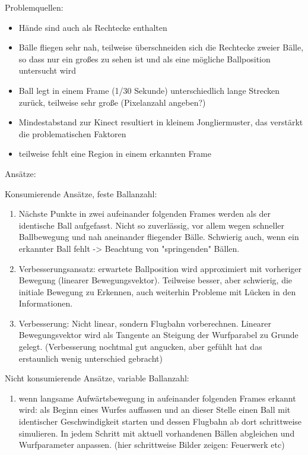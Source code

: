 \documentclass[12pt,a4paper,ngerman]{scrartcl}
\begin{document}
Problemquellen: 

\begin{itemize}
 \item Hände sind auch als Rechtecke enthalten 
 \item Bälle fliegen sehr nah, teilweise überschneiden sich die Rechtecke zweier Bälle, so dass nur ein großes zu sehen ist und als eine mögliche Ballposition untersucht wird
 \item Ball legt in einem Frame (1/30 Sekunde) unterschiedlich lange Strecken zurück, teilweise sehr große (Pixelanzahl angeben?) 
 \item Mindestabstand zur Kinect resultiert in kleinem Jongliermuster, das verstärkt die problematischen Faktoren
 \item teilweise fehlt eine Region in einem erkannten Frame
\end{itemize}
 
Ansätze:
 
Konsumierende Ansätze, feste Ballanzahl:
 
 \begin{enumerate}
 \item Nächste Punkte in zwei aufeinander folgenden Frames werden als der identische Ball aufgefasst. Nicht so zuverlässig, vor allem wegen schneller Ballbewegung und nah aneinander fliegender Bälle. Schwierig auch, wenn ein erkannter Ball fehlt -> Beachtung von "springenden" Bällen.
 \item Verbesserungsansatz: erwartete Ballposition wird approximiert mit vorheriger Bewegung (linearer Bewegungsvektor). Teilweise besser, aber schwierig, die initiale Bewegung zu Erkennen, auch weiterhin Probleme mit Lücken in den Informationen.
 \item Verbesserung: Nicht linear, sondern Flugbahn vorberechnen. Linearer Bewegungsvektor wird als Tangente an Steigung der Wurfparabel zu Grunde gelegt. (Verbesserung nochtmal gut angucken, aber gefühlt hat das erstaunlich wenig unterschied gebracht)
  \end{enumerate}
  
Nicht konsumierende Ansätze, variable Ballanzahl:
  
\begin{enumerate}
	\item wenn langsame Aufwärtsbewegung in aufeinander folgenden Frames erkannt wird: als Beginn eines Wurfes auffassen und an dieser Stelle einen Ball mit identischer Geschwindigkeit starten und dessen Flugbahn ab dort schrittweise simulieren. In jedem Schritt mit aktuell vorhandenen Bällen abgleichen und Wurfparameter anpassen. (hier schrittweise Bilder zeigen: Feuerwerk etc)
\end{enumerate}
\end{document}
